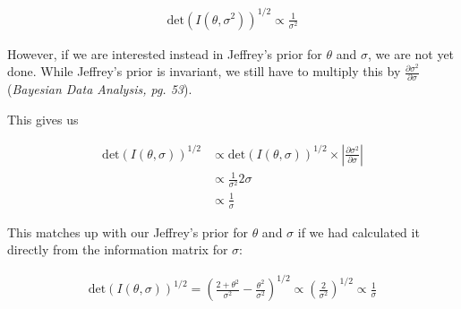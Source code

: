 \documentclass[12pt,a4paper]{article}
\begin{document}
\begin{align*}
	\text{det}(I(\theta, \sigma^2))^{1/2} \propto \frac{1}{\sigma^2}
\end{align*}

However, if we are interested instead in Jeffrey's prior for $\theta$ and $\sigma$, we are not yet done.
While Jeffrey's prior is invariant, we still have to multiply this by $\frac{\partial \sigma^2}{\partial \sigma}$ (\textit{Bayesian Data Analysis, pg. 53}).

This gives us

\begin{align*}
	\text{det}(I(\theta, \sigma))^{1/2} &\propto \text{det}(I(\theta, \sigma))^{1/2} \times | \frac{\partial \sigma^2}{\partial \sigma} | \\
										&\propto \frac{1}{\sigma^2} 2\sigma \\
										&\propto \frac{1}{\sigma}
\end{align*}

This matches up with our Jeffrey's prior for $\theta$ and $\sigma$ if we had calculated it directly from the information matrix for $\sigma$:

\begin{align*}
	\text{det}(I(\theta, \sigma))^{1/2} = \left(\frac{2+\theta^2}{\sigma^2} - \frac{\theta^2}{\sigma^2}\right)^{1/2} \propto \left(\frac{2}{\sigma^2}\right)^{1/2} \propto \frac{1}{\sigma}
\end{align*}
\end{document}
